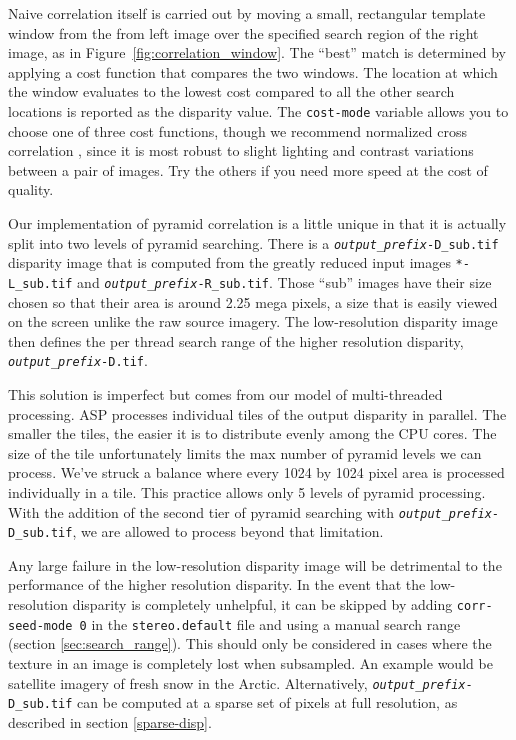 Naive correlation itself is carried out by moving a small, rectangular
template window from the from left image over the specified search
region of the right image, as in Figure~\ref{fig:correlation_window}.
The ``best'' match is determined by applying a cost function that
compares the two windows. The location at which the window evaluates
to the lowest cost compared to all the other search locations is
reported as the disparity value. The \texttt{cost-mode} variable allows you
to choose one of three cost functions, though we recommend normalized
cross correlation \citep{Menard97:robust}, since it is most robust to
slight lighting and contrast variations between a pair of
images. Try the others if you need more speed at the cost of quality.

Our implementation of pyramid correlation is a little unique in that
it is actually split into two levels of pyramid searching. There is a
\texttt{\textit{output\_prefix}-D\_sub.tif} disparity image that is
computed from the greatly reduced input images \texttt{*-L\_sub.tif}
and \texttt{\textit{output\_prefix}-R\_sub.tif}. Those ``sub'' images
have their size chosen so that their area is around 2.25 mega pixels,
a size that is easily viewed on the screen unlike the raw source
imagery. The low-resolution disparity image then defines the per
thread search range of the higher resolution disparity,
\texttt{\textit{output\_prefix}-D.tif}.

This solution is imperfect but comes from our model of multi-threaded
processing. ASP processes individual tiles of the output disparity
in parallel. The smaller the tiles, the easier it is to distribute
evenly among the CPU cores. The size of the tile unfortunately
limits the max number of pyramid levels we can process. We've struck
a balance where every 1024 by 1024 pixel area is processed individually
in a tile. This practice allows only 5 levels of pyramid processing.
With the addition of the second tier of pyramid searching with
\texttt{\textit{output\_prefix}-D\_sub.tif}, we are allowed to
process beyond that limitation.

Any large failure in the low-resolution disparity image will be
detrimental to the performance of the higher resolution disparity. In
the event that the low-resolution disparity is completely unhelpful, it
can be skipped by adding \texttt{corr-seed-mode 0} in the
\texttt{stereo.default} file and using a manual search range (section
\ref{sec:search_range}). This should only be considered in cases where
the texture in an image is completely lost when subsampled. An example
would be satellite imagery of fresh snow in the Arctic. Alternatively,
\texttt{\textit{output\_prefix}-D\_sub.tif} can be computed at a sparse
set of pixels at full resolution, as described in section
\ref{sparse-disp}.

